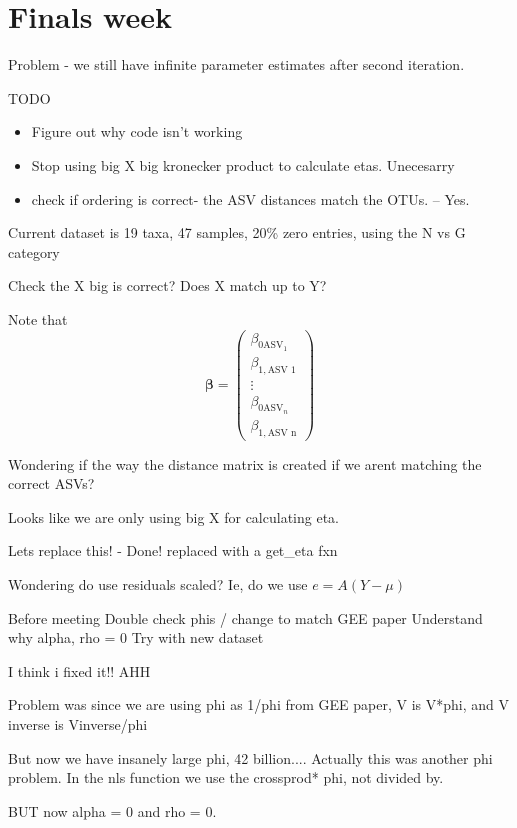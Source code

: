 \documentclass[10pt]{article}
\begin{document}
\section{Finals week}

Problem - we still have infinite parameter estimates after second iteration.


TODO
\begin{itemize}
  \item Figure out why code isn't working


  \item Stop using big X big kronecker product to calculate etas. Unecesarry
  \item check if ordering is correct- the ASV distances match the OTUs. -- Yes.
\end{itemize}

Current dataset is 19 taxa, 47 samples, 20\% zero entries, using the N vs G category


Check the X big is correct? Does X match up to Y?

Note that
\[\boldsymbol\beta = \begin{pmatrix}\beta_{0\text{ASV}_1} \\ \beta_{1, \text{ASV 1}} \\ \vdots \\ \beta_{0\text{ASV}_n} \\ \beta_{1, \text{ASV n}}\end{pmatrix} \]


Wondering if the way the distance matrix is created if we arent matching the correct ASVs?



Looks like we are only using big X for calculating eta.

Lets replace this! - Done! replaced with a get\_eta fxn


Wondering do use residuals scaled?
Ie, do we use $e = A (Y - \mu)$

Before meeting
Double check phis / change to match GEE paper
Understand why alpha, rho = 0
Try with new dataset

I think i fixed it!! AHH

Problem was since we are using phi as 1/phi from GEE paper, V is V*phi, and V inverse is Vinverse/phi

But now we have insanely large phi, 42 billion....
Actually this was another phi problem. In the nls function we use the crossprod* phi, not divided by. 

BUT now alpha = 0 and rho = 0.
\end{document}
